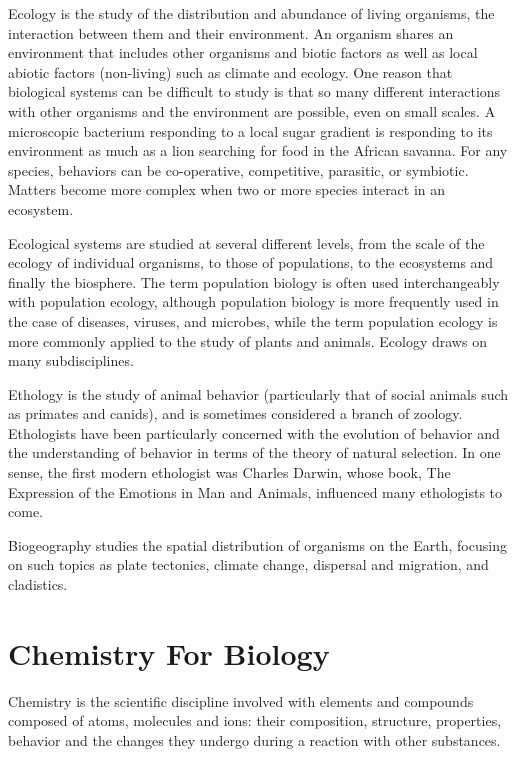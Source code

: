 \documentclass[
]{book}
\begin{document}
Ecology is the study of the distribution and abundance of living organisms, the interaction between them and their environment. An organism shares an environment that includes other organisms and biotic factors as well as local abiotic factors (non-living) such as climate and ecology. One reason that biological systems can be difficult to study is that so many different interactions with other organisms and the environment are possible, even on small scales. A microscopic bacterium responding to a local sugar gradient is responding to its environment as much as a lion searching for food in the African savanna. For any species, behaviors can be co-operative, competitive, parasitic, or symbiotic. Matters become more complex when two or more species interact in an ecosystem.

Ecological systems are studied at several different levels, from the scale of the ecology of individual organisms, to those of populations, to the ecosystems and finally the biosphere. The term population biology is often used interchangeably with population ecology, although population biology is more frequently used in the case of diseases, viruses, and microbes, while the term population ecology is more commonly applied to the study of plants and animals. Ecology draws on many subdisciplines.

Ethology is the study of animal behavior (particularly that of social animals such as primates and canids), and is sometimes considered a branch of zoology. Ethologists have been particularly concerned with the evolution of behavior and the understanding of behavior in terms of the theory of natural selection. In one sense, the first modern ethologist was Charles Darwin, whose book, The Expression of the Emotions in Man and Animals, influenced many ethologists to come.

Biogeography studies the spatial distribution of organisms on the Earth, focusing on such topics as plate tectonics, climate change, dispersal and migration, and cladistics.

\hypertarget{chemistry-for-biology}{%
\chapter{Chemistry For Biology}\label{chemistry-for-biology}}

Chemistry is the scientific discipline involved with elements and compounds composed of atoms, molecules and ions: their composition, structure, properties, behavior and the changes they undergo during a reaction with other substances.
\end{document}
